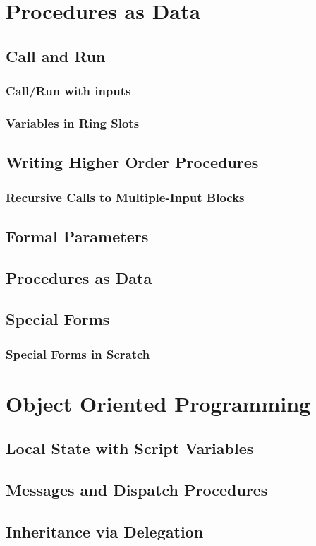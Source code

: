 \documentclass[a4paper]{report}
\begin{document}
\chapter{Procedures as Data}
\section{Call and Run}
\subsection{Call/Run with inputs}
\subsection{Variables in Ring Slots}
\section{Writing Higher Order Procedures}
\subsection{Recursive Calls to Multiple-Input Blocks}
\section{Formal Parameters}
\section{Procedures as Data}
\section{Special Forms}
\subsection{Special Forms in Scratch}
\chapter{Object Oriented Programming}
\section{Local State with Script Variables}
\section{Messages and Dispatch Procedures}
\section{Inheritance via Delegation}
\end{document}
